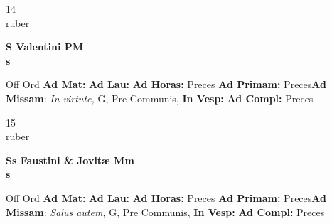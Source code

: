 \documentclass[10pt, openany]{book}
\begin{document}
    \begin{center}
        \begin{minipage}{3.5in}
            \vspace{2em}
            \begin{minipage}{0.5in}
                {\Huge 14} \\
                {\normalsize ruber}
            \end{minipage}
            \begin{minipage}{3.0in}
                \textbf{ \large S Valentini PM \\
                \textnormal{\normalsize s}}

            \end{minipage}
            \begin{justify}Off Ord
                \textbf{Ad Mat: }
                \textbf{Ad Lau: }
                \textbf{Ad Horas: }Preces
                \textbf{Ad Primam: }Preces\textbf{Ad Missam}: \textit{In virtute,} G, Pre Communis, 
                \textbf{In Vesp: }
                \textbf{Ad Compl: }Preces
            \end{justify}
        \end{minipage}
    \end{center}

    \begin{center}
        \begin{minipage}{3.5in}
            \vspace{2em}
            \begin{minipage}{0.5in}
                {\Huge 15} \\
                {\normalsize ruber}
            \end{minipage}
            \begin{minipage}{3.0in}
                \textbf{ \large Ss Faustini \& Jovitæ Mm \\
                \textnormal{\normalsize s}}

            \end{minipage}
            \begin{justify}Off Ord
                \textbf{Ad Mat: }
                \textbf{Ad Lau: }
                \textbf{Ad Horas: }Preces
                \textbf{Ad Primam: }Preces\textbf{Ad Missam}: \textit{Salus autem,} G, Pre Communis, 
                \textbf{In Vesp: }
                \textbf{Ad Compl: }Preces
            \end{justify}
        \end{minipage}
    \end{center}
\end{document}
